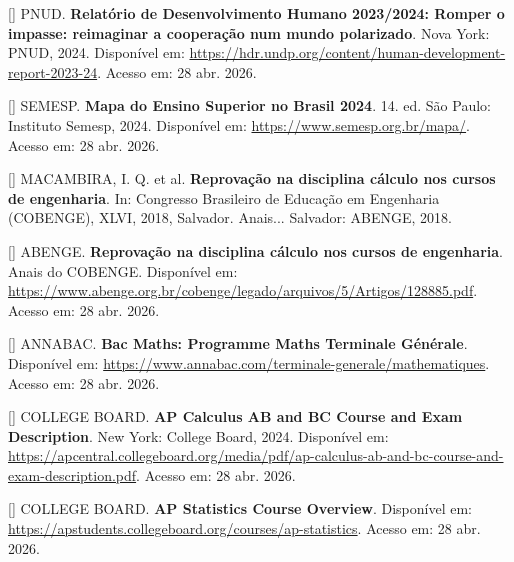 \documentclass[12pt,a4paper,oneside]{article}
\begin{document}
\begin{singlespace}

\noindent\hangindent=1.25cm
[\theequation\label{ref:pnud-2024}]
PNUD. \textbf{Relatório de Desenvolvimento Humano 2023/2024: Romper o impasse: reimaginar a cooperação num mundo polarizado}. Nova York: PNUD, 2024. Disponível em: \url{https://hdr.undp.org/content/human-development-report-2023-24}. Acesso em: 28 abr. 2026.\par\smallskip

\noindent\hangindent=1.25cm
[\theequation\label{ref:semesp-2024}]
SEMESP. \textbf{Mapa do Ensino Superior no Brasil 2024}. 14. ed. São Paulo: Instituto Semesp, 2024. Disponível em: \url{https://www.semesp.org.br/mapa/}. Acesso em: 28 abr. 2026.\par\smallskip

\noindent\hangindent=1.25cm
[\theequation\label{ref:abenge-2018}]
MACAMBIRA, I. Q. et al. \textbf{Reprovação na disciplina cálculo nos cursos de engenharia}. In: Congresso Brasileiro de Educação em Engenharia (COBENGE), XLVI, 2018, Salvador. Anais... Salvador: ABENGE, 2018.\par\smallskip

\noindent\hangindent=1.25cm
[\theequation\label{ref:abenge-reprovacao}]
ABENGE. \textbf{Reprovação na disciplina cálculo nos cursos de
engenharia}. Anais do COBENGE. Disponível em:
\url{https://www.abenge.org.br/cobenge/legado/arquivos/5/Artigos/128885.pdf}.
Acesso em: 28 abr. 2026.\par\smallskip

\noindent\hangindent=1.25cm
[\theequation\label{ref:annabac}]
ANNABAC. \textbf{Bac Maths: Programme Maths Terminale Générale}.
Disponível em: \url{https://www.annabac.com/terminale-generale/mathematiques}.
Acesso em: 28 abr. 2026.\par\smallskip

\noindent\hangindent=1.25cm
[\theequation\label{ref:ap-calculus}]
COLLEGE BOARD. \textbf{AP Calculus AB and BC Course and Exam
Description}. New York: College Board, 2024. Disponível em:
\url{https://apcentral.collegeboard.org/media/pdf/ap-calculus-ab-and-bc-course-and-exam-description.pdf}.
Acesso em: 28 abr. 2026.\par\smallskip

\noindent\hangindent=1.25cm
[\theequation\label{ref:ap-statistics}]
COLLEGE BOARD. \textbf{AP Statistics Course Overview}. Disponível
em: \url{https://apstudents.collegeboard.org/courses/ap-statistics}.
Acesso em: 28 abr. 2026.\par\smallskip


\end{singlespace}
\end{document}
